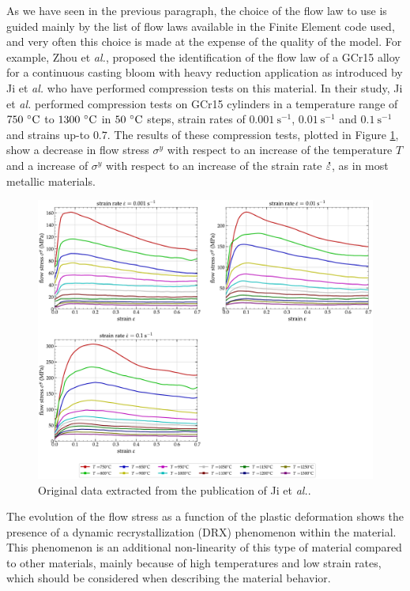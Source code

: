\documentclass[algorithms,article,submit,pdftex,moreauthors]{Definitions/mdpi}
\makeatletter
\DeclareRobustCommand{\mdot}[1]{\accentset{\mbox{\bfseries .}}{#1}}
\DeclareRobustCommand{\eal}{et \emph{al.}\@\xspace}
\DeclareRobustCommand{\ps}{\text{s}^{-1}}
\makeatother
\begin{document}
As we have seen in the previous paragraph, the choice of the flow law to use is guided mainly by the list of flow laws available in the Finite Element code used, and very often this choice is made at the expense of the quality of the model.
For example, Zhou \eal \cite{Zhou-2020}, proposed the identification of the flow law of a GCr15 alloy for a continuous casting bloom with heavy reduction application as introduced by Ji \eal \cite{Ji-2018} who have performed compression tests on this material.
In their study, Ji \eal \cite{Ji-2018} performed compression tests on GCr15 cylinders in a temperature range of $750~\celsius$ to $1300~\celsius$ in $50~\celsius$ steps, strain rates of $0.001~\ps$,  $0.01~\ps$ and $0.1~\ps$ and strains up-to $0.7$.
The results of these compression tests, plotted in Figure \ref{fig:Zhou-OriginalData}, show a decrease in flow stress $\sigma^y$ with respect to an increase of the temperature $T$ and a increase of $\sigma^y$ with respect to an increase of the strain rate $\mdot\varepsilon$, as in most metallic materials.
\begin{figure}[!ht]
\centering
\includegraphics[width=0.9\columnwidth]{Figures/Zhou-OriginalData}
\caption{Original data extracted from the publication of Ji \eal \cite{Ji-2018}.}
\label{fig:Zhou-OriginalData}
\end{figure}
The evolution of the flow stress as a function of the plastic deformation shows the presence of a dynamic recrystallization (DRX) phenomenon within the material.
This phenomenon is an additional non-linearity of this type of material compared to other materials, mainly because of high temperatures and low strain rates, which should be considered when describing the material behavior.
\end{document}
